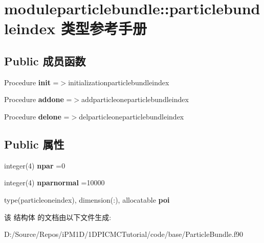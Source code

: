 \hypertarget{structmoduleparticlebundle_1_1particlebundleindex}{}\section{moduleparticlebundle\+::particlebundleindex 类型参考手册}
\label{structmoduleparticlebundle_1_1particlebundleindex}
\subsection*{Public 成员函数}
\begin{DoxyCompactItemize}
\item 
\mbox{\label{structmoduleparticlebundle_1_1particlebundleindex_af562f8c25b63db48d45811bb8b431a3b}} 
Procedure {\bfseries init} =$>$initializationparticlebundleindex
\item 
\mbox{\label{structmoduleparticlebundle_1_1particlebundleindex_a1e354d4eefac23697523766dd5088d4e}} 
Procedure {\bfseries addone} =$>$addparticleoneparticlebundleindex
\item 
\mbox{\label{structmoduleparticlebundle_1_1particlebundleindex_af22921f994138a65da0fd9ded27c5ec4}} 
Procedure {\bfseries delone} =$>$delparticleoneparticlebundleindex
\end{DoxyCompactItemize}
\subsection*{Public 属性}
\begin{DoxyCompactItemize}
\item 
\mbox{\label{structmoduleparticlebundle_1_1particlebundleindex_a5d5918f5a6645d4da244e09906831dcd}} 
integer(4) {\bfseries npar} =0
\item 
\mbox{\label{structmoduleparticlebundle_1_1particlebundleindex_ae96ef189b2e7d778889a08e54c9fcf82}} 
integer(4) {\bfseries nparnormal} =10000
\item 
\mbox{\label{structmoduleparticlebundle_1_1particlebundleindex_a62a34304508d4af14d229cae41d0244b}} 
type(particleoneindex), dimension(\+:), allocatable {\bfseries poi}
\end{DoxyCompactItemize}


该 结构体 的文档由以下文件生成\+:\begin{DoxyCompactItemize}
\item 
D\+:/\+Source/\+Repos/i\+P\+M1\+D/1\+D\+P\+I\+C\+M\+C\+Tutorial/code/base/Particle\+Bundle.\+f90\end{DoxyCompactItemize}
